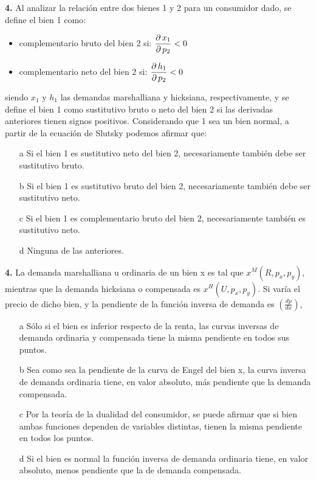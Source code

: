 \documentclass{nuevotema}
\begin{document}
\textbf{4.} Al analizar la relación entre dos bienes 1 y 2 para un consumidor dado, se define el bien 1 como:
\begin{itemize}
	\item complementario bruto del bien 2 si: $\dfrac{\partial \, x_1}{\partial \, p_2} < 0$
	\item complementario neto del bien 2 si: $\dfrac{\partial \, h_1}{\partial \, p_2} < 0$
\end{itemize}

siendo $x_1$ y $h_1$ las demandas marshalliana y hicksiana, respectivamente, y se define el bien 1 como sustitutivo bruto o neto del bien 2 si las derivadas anteriores tienen signos positivos. Considerando que 1 sea un bien normal, a partir de la ecuación de Slutsky podemos afirmar que:

\begin{enumerate}
	\item[a] Si el bien 1 es sustitutivo neto del bien 2, necesariamente también debe ser sustitutivo bruto.
	\item[b] Si el bien 1 es sustitutivo bruto del bien 2, necesariamente también debe ser sustitutivo neto.
	\item[c] Si el bien 1 es complementario bruto del bien 2, necesariamente también es sustitutivo neto.
	\item[d] Ninguna de las anteriores. 
\end{enumerate}


\textbf{4.} La demanda marshalliana u ordinaria de un bien x es tal que $x^M(R, p_x, p_y)$, mientras que la demanda hicksiana o compensada es $x^H(U, p_x, p_y)$. Si varía el precio de dicho bien, y la pendiente de la función inversa de demanda es $\left( \frac{ dp}{dx} \right)$, 
\begin{enumerate}
    \item[a] Sólo si el bien es inferior respecto de la renta, las curvas inversas de demanda ordinaria y compensada tiene la misma pendiente en todos sus puntos.
    \item[b] Sea como sea la pendiente de la curva de Engel del bien x, la curva inversa de demanda ordinaria tiene, en valor absoluto, más pendiente que la demanda compensada.
    \item[c] Por la teoría de la dualidad del consumidor, se puede afirmar que si bien ambas funciones dependen de variables distintas, tienen la misma pendiente en todos los puntos.
    \item[d] Si el bien es normal la función inversa de demanda ordinaria tiene, en valor absoluto, menos pendiente que la de demanda compensada.
\end{enumerate}
\end{document}

